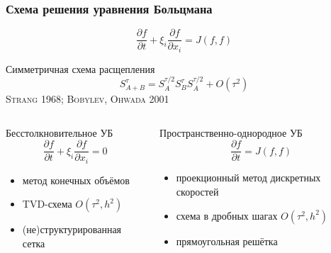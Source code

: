 \documentclass[mathserif]{beamer} %
\newcommand{\pder}[2][]{\frac{\partial#1}{\partial#2}}
\newcommand{\OO}[1]{O(#1)}
\newcommand{\Cite}[2][]{\alert{\textsc{#2 #1}}}
\begin{document}
\begin{frame}
    \frametitle{Схема решения уравнения Больцмана}
    \vspace{-5pt}
    \begin{equation}
        \pder[f]{t} + \xi_i\pder[f]{x_i} = J(f,f)
    \end{equation}
    \pause\vspace{-10pt}
    \begin{block}{Симметричная схема расщепления}
        \begin{equation}
            S_{A+B}^{\tau} = S_A^{\tau/2}S_B^{\tau}S_A^{\tau/2} + \OO{\tau^2}
        \end{equation}
        \centering \Cite[1968]{Strang}; \Cite[2001]{Bobylev, Ohwada}
    \end{block}
    \vspace{-10pt}
    \begin{columns}[T]
        \pause
        \begin{column}{5cm}
            \begin{block}{Бесстолкновительное УБ}
                \begin{equation}
                    \pder[f]{t} + \xi_i\pder[f]{x_i} = 0
                \end{equation}
                \vspace{-15pt}
                \begin{itemize}
                    \item метод конечных объёмов
                    \item TVD-схема \(\OO{\tau^2, h^2}\)
                    \item (не)структурированная сетка
                \end{itemize}
            \end{block}
        \end{column}
        \pause
        \begin{column}{6.5cm}
            \begin{block}{Пространственно-однородное УБ}
                \begin{equation}
                    \pder[f]{t} = J(f,f)
                \end{equation}
                \vspace{-15pt}
                \begin{itemize}
                    \item проекционный метод дискретных скоростей
                    \item схема в дробных шагах \(\OO{\tau^2, h^2}\)
                    \item прямоугольная решётка
                \end{itemize}
            \end{block}
        \end{column}
    \end{columns}
\end{frame}
\end{document}

